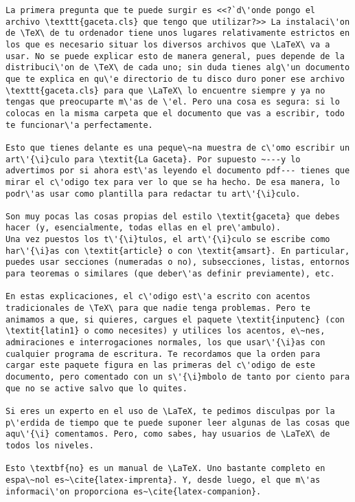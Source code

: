 \documentclass[11pt, a4paper]{article}
\begin{document}
\begin{lstlisting}
La primera pregunta que te puede surgir es <<?`d\'onde pongo el archivo \texttt{gaceta.cls} que tengo que utilizar?>> La instalaci\'on de \TeX\ de tu ordenador tiene unos lugares relativamente estrictos en los que es necesario situar los diversos archivos que \LaTeX\ va a usar. No se puede explicar esto de manera general, pues depende de la distribuci\'on de \TeX\ de cada uno; sin duda tienes alg\'un documento que te explica en qu\'e directorio de tu disco duro poner ese archivo \texttt{gaceta.cls} para que \LaTeX\ lo encuentre siempre y ya no tengas que preocuparte m\'as de \'el. Pero una cosa es segura: si lo colocas en la misma carpeta que el documento que vas a escribir, todo te funcionar\'a perfectamente.

Esto que tienes delante es una peque\~na muestra de c\'omo escribir un art\'{\i}culo para \textit{La Gaceta}. Por supuesto ~---y lo advertimos por si ahora est\'as leyendo el documento pdf--- tienes que mirar el c\'odigo tex para ver lo que se ha hecho. De esa manera, lo podr\'as usar como plantilla para redactar tu art\'{\i}culo.

Son muy pocas las cosas propias del estilo \textit{gaceta} que debes hacer (y, esencialmente, todas ellas en el pre\'ambulo).
Una vez puestos los t\'{\i}tulos, el art\'{\i}culo se escribe como har\'{\i}as con \textit{article} o con \textit{amsart}. En particular, puedes usar secciones (numeradas o no), subsecciones, listas, entornos para teoremas o similares (que deber\'as definir previamente), etc.

En estas explicaciones, el c\'odigo est\'a escrito con acentos tradicionales de \TeX\ para que nadie tenga problemas. Pero te animamos a que, si quieres, cargues el paquete \textit{inputenc} (con \textit{latin1} o como necesites) y utilices los acentos, e\~nes, admiraciones e interrogaciones normales, los que usar\'{\i}as con cualquier programa de escritura. Te recordamos que la orden para cargar este paquete figura en las primeras del c\'odigo de este documento, pero comentado con un s\'{\i}mbolo de tanto por ciento para que no se active salvo que lo quites.

Si eres un experto en el uso de \LaTeX, te pedimos disculpas por la p\'erdida de tiempo que te puede suponer leer algunas de las cosas que aqu\'{\i} comentamos. Pero, como sabes, hay usuarios de \LaTeX\ de todos los niveles.

Esto \textbf{no} es un manual de \LaTeX. Uno bastante completo en espa\~nol es~\cite{latex-imprenta}. Y, desde luego, el que m\'as informaci\'on proporciona es~\cite{latex-companion}.


\end{lstlisting}
\end{document}
